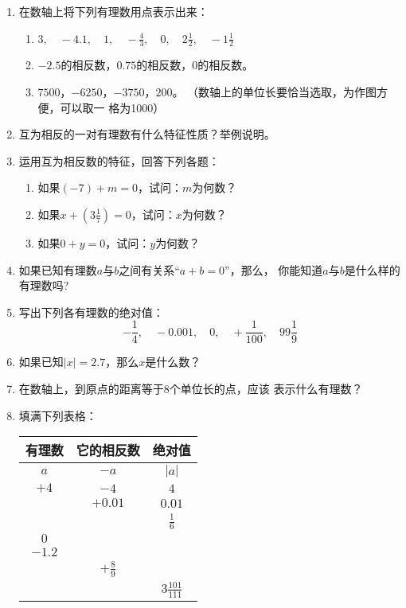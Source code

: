 \begin{enumerate}
	
	\item 在数轴上将下列有理数用点表示出来：
	\begin{enumerate}
		\item $3,\quad -4.1,\quad 1,\quad -\frac{4}{3},\quad 0,\quad 2\frac{1}{2},\quad -1\frac{1}{2}$
		\item $-2.5$的相反数，$0.75$的相反数，0的相反数。
		\item $7500$，$-6250$，$-3750$，$200$。
		（数轴上的单位长要恰当选取，为作图方便，可以取一
		格为1000）
	\end{enumerate}
	
	
	\item 互为相反的一对有理数有什么特征性质？举例说明。
	\item 运用互为相反数的特征，回答下列各题：
	\begin{enumerate}
		\item 如果$(-7) +m=0$，试问：$m$为何数？
		\item 如果$x+\left(3\frac{1}{7}\right)=0$，试问：$x$为何数？
		\item 如果$0+y=0$，试问：$y$为何数？
	\end{enumerate}
	
	
	\item 如果已知有理数$a$与$b$之间有关系“$a+b=0$”，那么，
	你能知道$a$与$b$是什么样的有理数吗?
	\item 写出下列各有理数的绝对值：
	\[-\frac{1}{4},\quad -0.001,\quad 0,\quad +\frac{1}{100},\quad 99\frac{1}{9}\]
	
	\item 如果已知$|x|= 2.7$，那么$x$是什么数？
	\item 在数轴上，到原点的距离等于8个单位长的点，应该
	表示什么有理数？
	\item 填满下列表格：
	\begin{center}
		\begin{tabular}{ccc}
			\hline
			有理数&它的相反数&绝对值\\
			\hline
			$a$  &   $-a$   &   $|a|$\\ 
			$+4$  &   $-4$   &   $4$\\ 
			&   $+0.01$   &   $0.01$\\ 
			&      &   $\frac{1}{6}$\\ 
			$0$  &      &   \\ 
			$-1.2$  &      &   \\ 
			&   $+\frac{8}{9}$   &   \\ 
			&      &   $3\frac{101}{111}$\\ 
			\hline
		\end{tabular}
	\end{center}
	

\end{enumerate}
